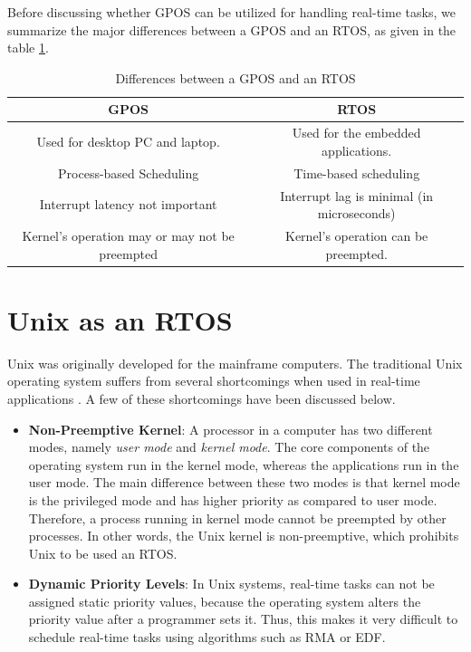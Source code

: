\documentclass[12pt]{report}
\begin{document}
Before discussing whether GPOS can be utilized for handling real-time tasks, we summarize the major differences between a GPOS and an RTOS, as given in the table \ref{tab:gpos-rtos}. 
\begin{table}[h]
    \centering
    \begin{tabular}{|c|c|}
        \hline
        \textbf{GPOS} & \textbf{RTOS} \\
        \hline \hline
        Used for desktop PC and laptop. & Used for the embedded applications. \\
        \hline
        Process-based Scheduling &	Time-based scheduling \\
        \hline 
        Interrupt latency not important & Interrupt lag is minimal (in microseconds)\\
        \hline
        Kernel's operation may or may not be preempted &Kernel's operation can be preempted.\\
        \hline
    \end{tabular}
    \caption{Differences between a GPOS and an RTOS}
    \label{tab:gpos-rtos}
\end{table} 

 \section{Unix as an RTOS}
 Unix was originally developed for the mainframe computers. The traditional Unix operating system suffers from several shortcomings when used in real-time applications \cite{NPTEL}. A few of these shortcomings have been discussed below. 
 \begin{itemize}
     \item \textbf{Non-Preemptive Kernel}: A processor in a computer has two different modes, namely \emph{user mode} and \emph{kernel mode}. The core components of the operating system run in the kernel mode, whereas the applications run in the user mode. The main difference between these two modes is that kernel mode is the privileged mode and has higher priority as compared to user mode. Therefore, a process running in kernel mode cannot be preempted by other processes. In other words, the Unix kernel is non-preemptive, which prohibits Unix to be used an RTOS. 
     \item \textbf{Dynamic Priority Levels}: In Unix systems, real-time tasks can not be assigned static priority values, because the operating system alters the priority value after a programmer sets it. Thus, this makes it very difficult to schedule real-time tasks using algorithms such as RMA or EDF.  
 \end{itemize}
 
\end{document}
